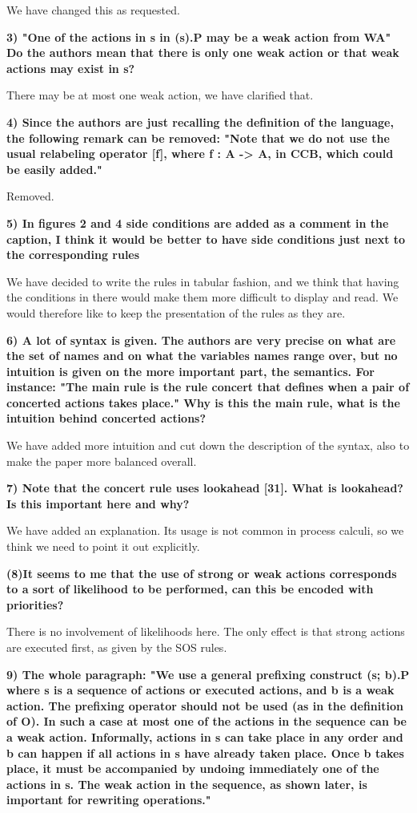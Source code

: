 \documentclass{article}
\begin{document}
We have changed this as requested.

\textbf{3) "One of the actions in s in (s).P may be a weak action from WA" Do the authors mean that there is only one weak action or that weak actions may exist in s?}

There may be at most one weak action, we have clarified that.

\textbf{4) Since the authors are just recalling the definition of the language, the following remark can be removed:
"Note that we do not use the usual relabeling operator [f], where f : A -> A, in CCB, which could be easily added."}

Removed.

\textbf{5) In figures 2 and 4 side conditions are added as a comment in the caption, I think it would be better to have side conditions just next to the corresponding rules}

We have decided to write the rules in tabular fashion, and we think that having the conditions in there would make them more difficult to display and read. We would therefore like to keep the presentation of the rules
as they are.

\textbf{6) A lot of syntax is given.  The authors are very precise on what are the set of names and on what the variables names range over, but no intuition is given on the more important part, the semantics.
For instance: "The main rule is the rule concert that defines when a pair of concerted actions takes place." Why is this the main rule, what is the intuition behind concerted actions?}

We have added more intuition and cut down the description of the syntax, also to make the paper more balanced overall.

\textbf{7) Note that the concert rule uses lookahead [31].
What is lookahead? Is this important here and why?}

We have added an explanation. Its usage is not common in process calculi, so we think we need to point it out explicitly.

\textbf{(8)It seems to me that the use of strong or weak actions corresponds to a sort of likelihood to be performed, can this be encoded with priorities?}

There is no involvement of likelihoods here. The only effect is that strong actions are executed first, as given by the SOS rules.

\textbf{9) The whole paragraph:
"We use a general prefixing construct (s; b).P where s is a sequence of actions or executed actions, and b is a weak action. The prefixing operator should not be used (as in the definition of O). In such a case at most one of the actions in the sequence can be a weak action. Informally, actions in s can take place in any order and b can happen if all actions in s have already taken place. Once b takes place, it must be accompanied by undoing immediately one of the actions in s. The weak action in the sequence, as shown later, is important for rewriting operations."}
\end{document}

